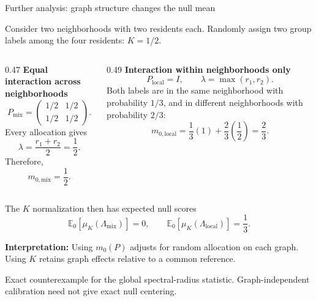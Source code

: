\documentclass[aspectratio=169,10pt]{beamer}
\begin{document}
\begin{frame}[shrink=0]{Further analysis: graph structure changes the null mean}
\small

Consider two neighborhoods with two residents each.
Randomly assign two group labels among the four residents:
$K=1/2$.

\begin{columns}[T,onlytextwidth]

\begin{column}{0.47\textwidth}
\textbf{Equal interaction across neighborhoods}
\[
    P_{\mathrm{mix}}=
    \begin{pmatrix}
        1/2&1/2\\
        1/2&1/2
    \end{pmatrix}.
\]
Every allocation gives
\[
    \lambda=\frac{r_1+r_2}{2}=\frac12.
\]
Therefore,
\[
    \boxed{m_{0,\mathrm{mix}}=\frac12}.
\]
\end{column}

\begin{column}{0.49\textwidth}
\textbf{Interaction within neighborhoods only}
\[
    P_{\mathrm{local}}=I,
    \qquad
    \lambda=\max(r_1,r_2).
\]
Both labels are in the same neighborhood with probability
$1/3$, and in different neighborhoods with probability $2/3$:
\[
    \boxed{
    m_{0,\mathrm{local}}
      =\frac13(1)+\frac23\left(\frac12\right)
      =\frac23}.
\]
\end{column}

\end{columns}

\medskip
The $K$ normalization then has expected null scores
\[
    \mathbb E_0[\mu_K(\Lambda_{\mathrm{mix}})]=0,
    \qquad
    \mathbb E_0[\mu_K(\Lambda_{\mathrm{local}})]=\frac13.
\]

\textbf{Interpretation:}
Using $m_0(P)$ adjusts for random allocation on each graph.
Using $K$ retains graph effects relative to a common reference.

\medskip
{\scriptsize
Exact counterexample for the global spectral-radius statistic.
Graph-independent calibration need not give exact null centering.
}

\end{frame}
\end{document}
